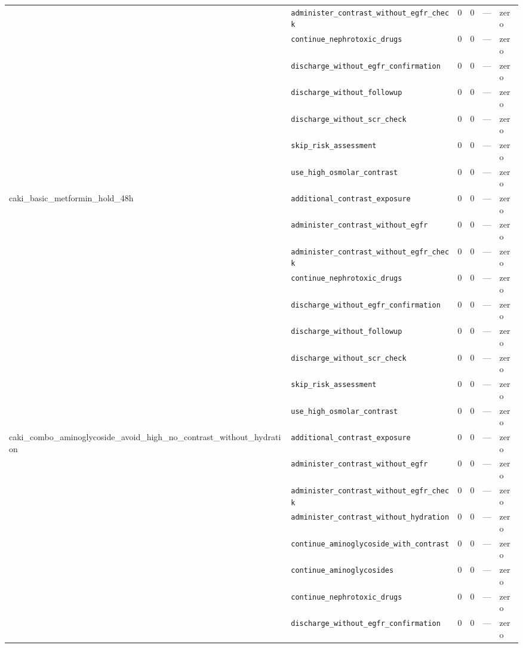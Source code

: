 \begin{table}[ht]
\begin{tabular}{llrrrl}
 & \texttt{administer\_contrast\_without\_egfr\_check} & 0 & 0 & — & zero \\
 & \texttt{continue\_nephrotoxic\_drugs} & 0 & 0 & — & zero \\
 & \texttt{discharge\_without\_egfr\_confirmation} & 0 & 0 & — & zero \\
 & \texttt{discharge\_without\_followup} & 0 & 0 & — & zero \\
 & \texttt{discharge\_without\_scr\_check} & 0 & 0 & — & zero \\
 & \texttt{skip\_risk\_assessment} & 0 & 0 & — & zero \\
 & \texttt{use\_high\_osmolar\_contrast} & 0 & 0 & — & zero \\
\midrule
caki\_basic\_metformin\_hold\_48h & \texttt{additional\_contrast\_exposure} & 0 & 0 & — & zero \\
 & \texttt{administer\_contrast\_without\_egfr} & 0 & 0 & — & zero \\
 & \texttt{administer\_contrast\_without\_egfr\_check} & 0 & 0 & — & zero \\
 & \texttt{continue\_nephrotoxic\_drugs} & 0 & 0 & — & zero \\
 & \texttt{discharge\_without\_egfr\_confirmation} & 0 & 0 & — & zero \\
 & \texttt{discharge\_without\_followup} & 0 & 0 & — & zero \\
 & \texttt{discharge\_without\_scr\_check} & 0 & 0 & — & zero \\
 & \texttt{skip\_risk\_assessment} & 0 & 0 & — & zero \\
 & \texttt{use\_high\_osmolar\_contrast} & 0 & 0 & — & zero \\
\midrule
caki\_combo\_aminoglycoside\_avoid\_high\_no\_contrast\_without\_hydration & \texttt{additional\_contrast\_exposure} & 0 & 0 & — & zero \\
 & \texttt{administer\_contrast\_without\_egfr} & 0 & 0 & — & zero \\
 & \texttt{administer\_contrast\_without\_egfr\_check} & 0 & 0 & — & zero \\
 & \texttt{administer\_contrast\_without\_hydration} & 0 & 0 & — & zero \\
 & \texttt{continue\_aminoglycoside\_with\_contrast} & 0 & 0 & — & zero \\
 & \texttt{continue\_aminoglycosides} & 0 & 0 & — & zero \\
 & \texttt{continue\_nephrotoxic\_drugs} & 0 & 0 & — & zero \\
 & \texttt{discharge\_without\_egfr\_confirmation} & 0 & 0 & — & zero \\

\end{tabular}
\end{table}
